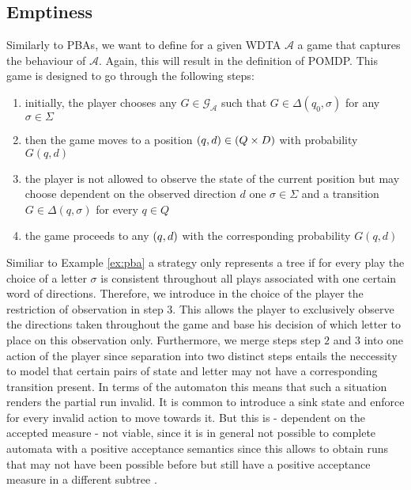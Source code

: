 \subsection{Emptiness}
Similarly to \acp{PBA}, we want to define for a given \ac{WDTA} $\mathcal{A}$
a game that captures the behaviour of $\mathcal{A}$. Again, this will result in
the definition of \ac{POMDP}. This game is designed to go through the following
steps:
\begin{enumerate}
  \item initially, the player chooses any $G\in\mathcal{G}_{\mathcal{A}}$
    such that $G\in\Delta(q_{0},\sigma)$ for any $\sigma\in\Sigma$
  \item then the game moves to a position $\left(q,d\right)\in\left(Q\times D\right)$
    with probability $G(q,d)$
  \item the player is not allowed to observe the state of the current position
    but may choose dependent on the observed direction $d$ one
    $\sigma\in\Sigma$ and a transition $G\in\Delta(q,\sigma)$ for every
    $q\in Q$
  \item the game proceeds to any $\left(q,d\right)$ with the corresponding
    probability $G(q,d)$
\end{enumerate}
Similiar to Example \ref{ex:pba} a strategy only represents a tree if for every
play the choice of a letter $\sigma$ is consistent throughout all plays
associated with one certain word of directions. Therefore, we introduce in the
choice of the player the restriction of observation in step $3$. This allows
the player to exclusively observe the directions taken throughout the game and
base his decision of which letter to place on this observation only.
Furthermore, we merge steps step $2$ and $3$ into one action of the player
since separation into two distinct steps entails the neccessity to model that
certain pairs of state and letter may not have a corresponding transition
present. In terms of the automaton this means that such a situation renders the
partial run invalid. It is common to introduce a sink state and enforce for
every invalid action to move towards it. But this is - dependent on the
accepted measure - not viable, since it is in general not possible to complete
automata with a positive acceptance semantics since this allows to obtain runs
that may not have been possible before but still have a positive acceptance
measure in a different subtree
\cite[cp. Introduction to chapter 3.8]{RandAutoInfTrees}.
